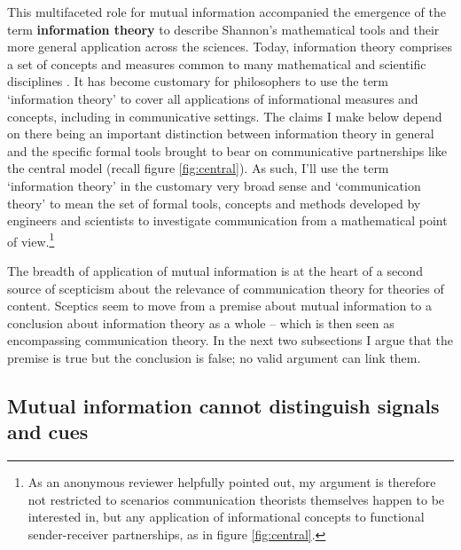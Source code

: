 \documentclass[12pt]{article}
\begin{document}
\noindent This multifaceted role for mutual information accompanied the emergence of the term \textbf{information theory} to describe Shannon's mathematical tools and their more general application across the sciences.
Today, information theory comprises a set of concepts and measures common to many mathematical and scientific disciplines \citep[p. 2, fig. 1.1]{cover2006elements}.
It has become customary for philosophers to use the term `information theory' to cover all applications of informational measures and concepts, including in communicative settings.
The claims I make below depend on there being an important distinction between information theory in general and the specific formal tools brought to bear on communicative partnerships like the central model (recall figure \ref{fig:central}).
As such, I'll use the term `information theory' in the customary very broad sense and `communication theory' to mean the set of formal tools, concepts and methods developed by engineers and scientists to investigate communication from a mathematical point of view.\footnote{As an anonymous reviewer helpfully pointed out, my argument is therefore not restricted to scenarios communication theorists themselves happen to be interested in, but any application of informational concepts to functional sender-receiver partnerships, as in figure \ref{fig:central}.}

The breadth of application of mutual information is at the heart of a second source of scepticism about the relevance of communication theory for theories of content.
Sceptics seem to move from a premise about mutual information to a conclusion about information theory as a whole -- which is then seen as encompassing communication theory.
In the next two subsections I argue that the premise is true but the conclusion is false; no valid argument can link them.

\subsection{Mutual information cannot distinguish signals and cues}

\end{document}
